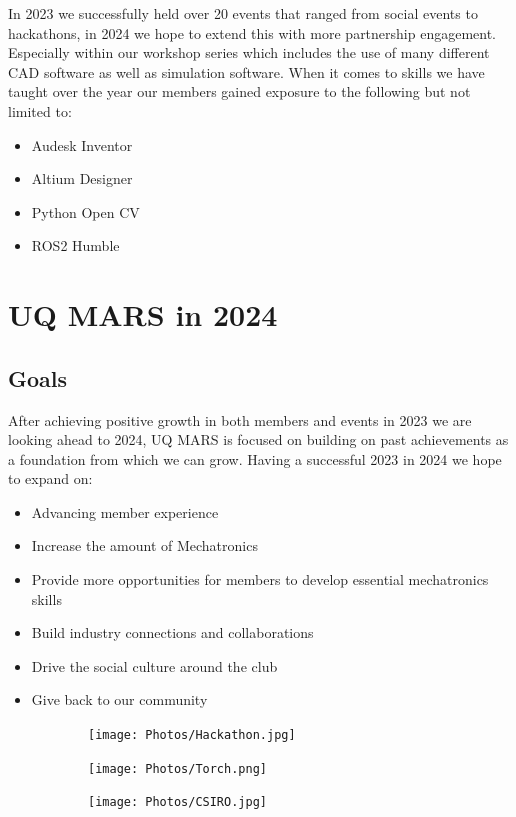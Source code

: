 \documentclass[a4paper,12pt]{report}
\begin{document}
In 2023 we successfully held over 20 events that ranged from social events to hackathons, in 2024 we hope to extend this with more partnership engagement. Especially within our workshop series which includes the use of many different CAD software as well as simulation software. When it comes to skills we have taught over the year our members gained exposure to the following but not limited to:
\begin{itemize}
    \item Audesk Inventor
    \item Altium Designer
    \item Python Open CV
    \item ROS2 Humble
\end{itemize}

\newpage

\section*{UQ MARS in 2024}
\subsection*{Goals}
After achieving positive growth in both members and events in 2023 we are looking ahead to 2024, UQ MARS is focused on building on past achievements as a foundation from which we can grow. Having a successful 2023 in 2024 we hope to expand on:
\begin{itemize}
    \item Advancing member experience
    \item Increase the amount of Mechatronics 
    \item Provide more opportunities for members to develop essential mechatronics skills
    \item Build industry connections and collaborations
    \item Drive the social culture around the club
    \item Give back to our community
\end{itemize}
\begin{figure}[H]
    \centering
    \begin{subfigure}{0.32\linewidth}
        \texttt{[image: Photos/Hackathon.jpg]}
    \end{subfigure}
    \begin{subfigure}{0.32\linewidth}
        \texttt{[image: Photos/Torch.png]}
    \end{subfigure}
    \begin{subfigure}{0.32\linewidth}
        \texttt{[image: Photos/CSIRO.jpg]}
    \end{subfigure}
\end{figure}
\end{document}
